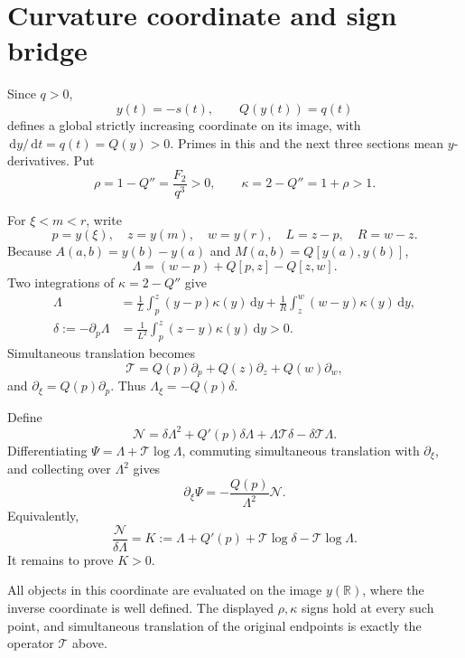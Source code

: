 \documentclass[11pt]{article}
\theoremstyle{remark}
\newcommand{\R}{\mathbb{R}}
\newcommand{\T}{\mathcal{T}}
\newcommand{\dd}{\,\mathrm{d}}
\numberwithin{equation}{section}
\begin{document}
\section{Curvature coordinate and sign bridge}\label{sec:coordinate}

Since \(q>0\),
\[
 y(t)=-s(t),\qquad Q(y(t))=q(t)
\]
defines a global strictly increasing coordinate on its image, with
\(\dd y/\dd t=q(t)=Q(y)>0\). Primes in this and the next three sections mean
\(y\)-derivatives. Put
\[
 \rho=1-Q''=\frac{F_2}{q^3}>0,
 \qquad \kappa=2-Q''=1+\rho>1.
\]

For \(\xi<m<r\), write
\[
 p=y(\xi),\quad z=y(m),\quad w=y(r),\quad L=z-p,\quad R=w-z.
\]
Because \(A(a,b)=y(b)-y(a)\) and
\(M(a,b)=Q[y(a),y(b)]\),
\begin{equation}\label{eq:Lambda-coordinate}
 \Lambda=(w-p)+Q[p,z]-Q[z,w].
\end{equation}
Two integrations of \(\kappa=2-Q''\) give
\begin{align}
 \Lambda&=\frac1L\int_p^z(y-p)\kappa(y)\dd y
 +\frac1R\int_z^w(w-y)\kappa(y)\dd y,\label{eq:Lambda-triangular}\\
 \delta:=-\partial_p\Lambda
 &=\frac1{L^2}\int_p^z(z-y)\kappa(y)\dd y>0.
 \label{eq:delta-triangular}
\end{align}
Simultaneous translation becomes
\[
 \T=Q(p)\partial_p+Q(z)\partial_z+Q(w)\partial_w,
\]
and \(\partial_\xi=Q(p)\partial_p\). Thus
\(\Lambda_\xi=-Q(p)\delta\).

Define
\begin{equation}\label{eq:N-def}
 \mathcal N=\delta\Lambda^2+Q'(p)\delta\Lambda+
 \Lambda\T\delta-\delta\T\Lambda.
\end{equation}
Differentiating \(\Psi=\Lambda+\T\log\Lambda\), commuting simultaneous
translation with \(\partial_\xi\), and collecting over \(\Lambda^2\) gives
\begin{equation}\label{eq:sign-bridge}
 \partial_\xi\Psi=-\frac{Q(p)}{\Lambda^2}\mathcal N.
\end{equation}
Equivalently,
\begin{equation}\label{eq:K-def}
 \frac{\mathcal N}{\delta\Lambda}
 =K:=\Lambda+Q'(p)+\T\log\delta-\T\log\Lambda.
\end{equation}
It remains to prove \(K>0\).

All objects in this coordinate are evaluated on the image \(y(\R)\), where
the inverse coordinate is well defined. The displayed \(\rho,\kappa\) signs
hold at every such point, and simultaneous translation of the original
endpoints is exactly the operator \(\T\) above.
\end{document}
